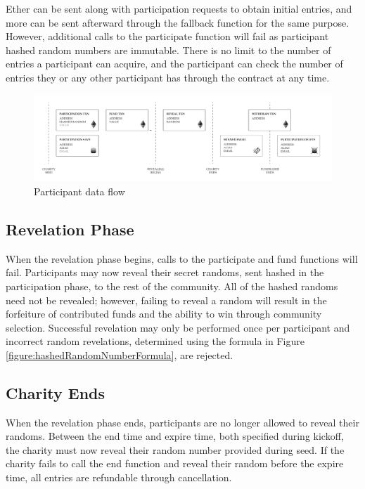 \documentclass[11pt]{article}
\begin{document}
Ether can be sent along with participation requests to obtain initial entries, and more can be sent afterward through the fallback function for the same purpose. However, additional calls to the participate function will fail as participant hashed random numbers are immutable. There is no limit to the number of entries a participant can acquire, and the participant can check the number of entries they or any other participant has through the contract at any time.

\begin{figure}[H]
\begin{center}
\includegraphics[width=1.0\textwidth]{participantDataFlow.pdf}
\caption{Participant data flow}
\label{figure:participantDataFlow}
\end{center}
\end{figure}

\subsection{Revelation Phase}

When the revelation phase begins, calls to the participate and fund functions will fail. Participants may now reveal their secret randoms, sent hashed in the participation phase, to the rest of the community. All of the hashed randoms need not be revealed; however, failing to reveal a random will result in the forfeiture of contributed funds and the ability to win through community selection. Successful revelation may only be performed once per participant and incorrect random revelations, determined using the formula in Figure \ref{figure:hashedRandomNumberFormula}, are rejected.

\subsection{Charity Ends}

When the revelation phase ends, participants are no longer allowed to reveal their randoms. Between the end time and expire time, both specified during kickoff, the charity must now reveal their random number provided during seed. If the charity fails to call the end function and reveal their random before the expire time, all entries are refundable through cancellation.
\end{document}
